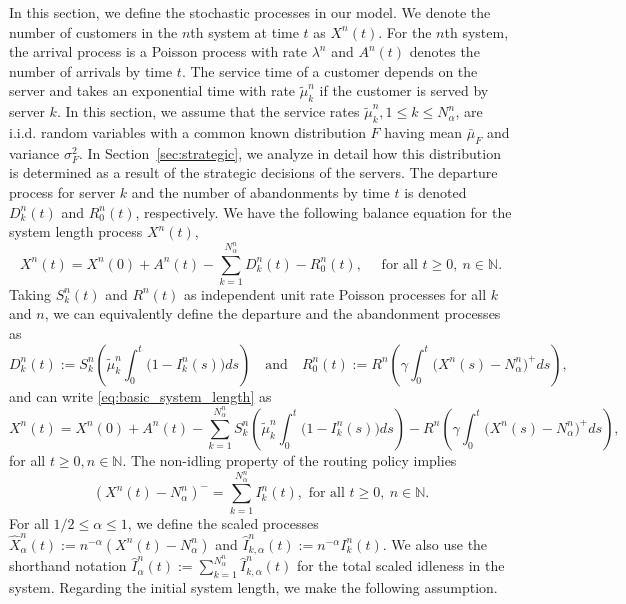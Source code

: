 \documentclass[a4paper,11pt,twoside]{article}
\numberwithin{equation}{section}
\numberwithin{figure}{section}
\theoremstyle{plain}
\newcommand{\NN}{\mathbb{N}}
\newcommand{\1}{\mathbbm{1}}
\begin{document}
In this section, we define the stochastic processes in our model. We denote the number of customers in the $n$th system at time $t$ as $X^n(t)$. For the $n$th system, the arrival process is a Poisson process with rate $\lambda^n$ and $A^n(t)$ denotes the number of arrivals by time $t$. The service time of a customer depends on the server and takes an exponential time with rate $\tilde{\mu}_k^n$ if the customer is served by server $k$. In this section, we assume that the service rates $\tilde{\mu}_k^n, 1\leq k\leq N_\alpha^n$, are i.i.d. random variables with a common known distribution $F$ having mean $\bar{\mu}_F$ and variance $\sigma_F^2$. %
In Section~\ref{sec:strategic}, we analyze in detail how this distribution is determined as a result of the strategic decisions of the servers. The departure process for server $k$  and the number of abandonments by time $t$ is denoted $D_k^n(t)$ and  $R_0^n(t)$, respectively. We have the following balance equation for the system length process $X^n(t)$, 
\begin{equation}
X^n(t) = X^n(0) + A^n(t) - \sum_{k=1}^{N_\alpha^n}D_k^n(t)-R_0^n(t), \quad \mbox{ for all }t\geq 0,\ n \in \NN.
\label{eq:basic_system_length}
\end{equation}
Taking $S_k^n(t)$ and $R^n(t)$ as independent unit rate Poisson processes for all $k$ and $n$, we can equivalently define the departure and the abandonment processes as 
\[
D_k^n(t)
:=S_k^n\left(\tilde{\mu}_k^n\int_0^t\big(1-I_k^n(s)\big)ds\right)
\quad \mbox{and}\quad 
R_0^n(t):=R^n\left(\gamma\int_0^t\big(X^n(s)-N^n_\alpha\big)^+ds\right),
\]
 and can write \eqref{eq:basic_system_length} as 
 \begin{equation}
 \label{eq:auxiliareqSystemLengthProcess}
 X^n(t) = X^n(0) + A^n(t) - \sum_{k=1}^{N_\alpha^n}S_k^n\left(\tilde{\mu}_k^n\int_0^t\big(1-I_k^n(s)\big)ds\right)-R^n\left(\gamma\int_0^t\big(X^n(s)-N^n_\alpha\big)^+ds\right),  
 \end{equation}
 for all $t\geq 0, n \in \NN$. The non-idling property of the routing policy implies 
 \[
 \left(X^n(t)-N^n_\alpha\right)^-=\sum_{k=1}^{N_\alpha^n}I^n_k(t), \mbox{ for all }t\geq 0,\  n\in \NN.
 \]
 For all $1/2\leq \alpha\leq 1$, we define the scaled processes $
  \hat{X}_\alpha^n(t):=n^{-\alpha}(X^n(t)-N_\alpha^n)$ and $\hat{I}_{k,\alpha}^n(t):=n^{-\alpha}I_k^n(t)$.
We also use the shorthand notation $\hat{I}_{\alpha}^n(t):=\sum_{k=1}^{N_\alpha^n}\hat{I}_{k,\alpha}^n(t)$ for the total scaled idleness in the system. 
Regarding the initial system length, we make the following assumption.
\end{document}
